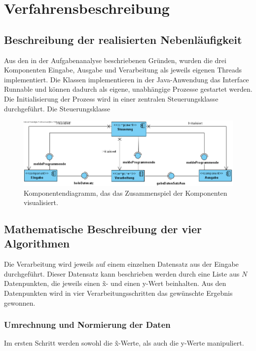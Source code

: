 \chapter{Verfahrensbeschreibung}\label{ch:verfahrensbeschreibung}

\section{Beschreibung der realisierten Nebenläufigkeit}\label{sec:nebenl}
Aus den in der Aufgabenanalyse beschriebenen Gründen, wurden die drei Komponenten Eingabe, Ausgabe und Verarbeitung als jeweils eigenen Threads implementiert.
Die Klassen implementieren in der Java-Anwendung das Interface Runnable und können dadurch als eigene, unabhängige Prozesse gestartet werden.
Die Initialisierung der Prozess wird in einer zentralen Steuerungsklasse durchgeführt.
Die Steuerungsklasse

\begin{figure}[htb]
    \centering
    \includegraphics[width=\linewidth]{images/ComponentDiagram1}
    \caption{
        Komponentendiagramm, das das Zusammenspiel der Komponenten visualisiert.
    }
    \label{fig:komoponent}
\end{figure}


\section{Mathematische Beschreibung der vier Algorithmen}\label{sec:mat-beschreibung}
Die Verarbeitung wird jeweils auf einem einzelnen Datensatz aus der Eingabe durchgeführt.
Dieser Datensatz kann beschrieben werden durch eine Liste aus $N$ Datenpunkten, die jeweils einen \~x- und einen y-Wert beinhalten.
Aus den Datenpunkten wird in vier Verarbeitungsschritten das gewünschte Ergebnis gewonnen.

\subsection{Umrechnung und Normierung der Daten}\label{subsec:umrechnung-und-normierung}
Im ersten Schritt werden sowohl die \~x-Werte, als auch die y-Werte manipuliert.

